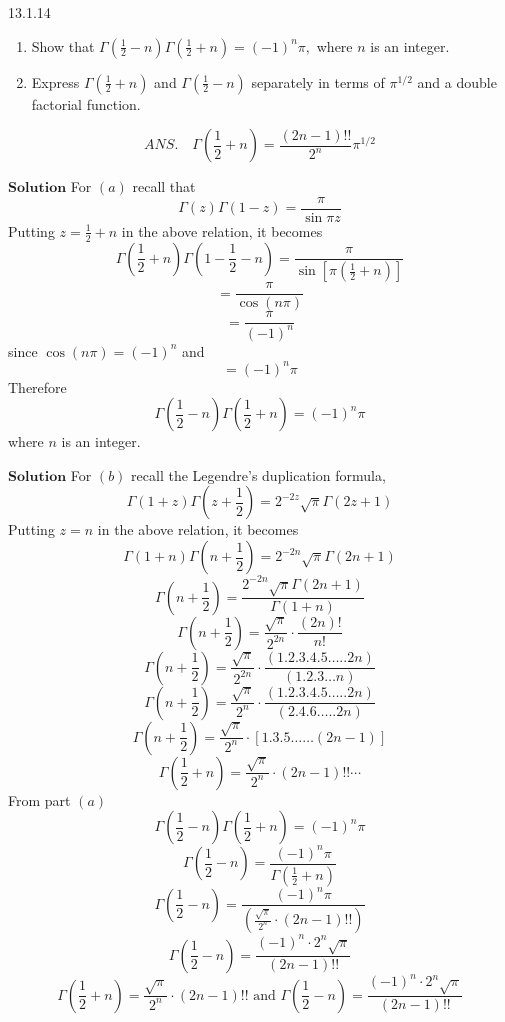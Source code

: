 \documentclass{styles/kaobook}
\begin{document}
\begin{greenbox}{13.1.14}
\begin{enumerate}[$(a)$]
\item Show that $\Gamma\left(\frac{1}{2}-n\right) \Gamma\left(\frac{1}{2}+n\right)=(-1)^{n} \pi,$ where $n$ is an integer. 
\item Express $\Gamma\left(\frac{1}{2}+n\right)$ and $\Gamma\left(\frac{1}{2}-n\right)$ separately in terms of $\pi^{1 / 2}$ and a double factorial function.
\end{enumerate}
$$
A N S . \quad \Gamma\left(\frac{1}{2}+n\right)=\frac{(2 n-1) ! !}{2^{n}} \pi^{1 / 2}
$$
\end{greenbox}

$\boxed{\textbf{Solution}}$ For $(a)$ recall that 
$$\Gamma(z) \Gamma(1-z)=\frac{\pi}{\sin \pi z}$$
Putting $z=\frac{1}{2}+n$ in the above relation, it becomes
$$
\Gamma\left(\frac{1}{2}+n\right) \Gamma\left(1-\frac{1}{2}-n\right)=\frac{\pi}{\sin \left[\pi\left(\frac{1}{2}+n\right)\right]}
$$
$$
=\frac{\pi}{\cos (n \pi)}
$$
$$
=\frac{\pi}{(-1)^{n}}
$$
since $\cos (n \pi)=(-1)^{n}$ and
$$
=(-1)^{n} \pi
$$
Therefore 
$$\Gamma\left(\frac{1}{2}-n\right) \Gamma\left(\frac{1}{2}+n\right)=(-1)^{n} \pi$$ where $n$ is an integer.

$\boxed{\textbf{Solution}}$ For $(b)$ recall the Legendre's duplication formula,
$$\Gamma(1+z) \Gamma\left(z+\frac{1}{2}\right)=2^{-2 z} \sqrt{\pi} \Gamma(2 z+1)$$
Putting $z=n$ in the above relation, it becomes
$$\Gamma(1+n) \Gamma\left(n+\frac{1}{2}\right)=2^{-2 n} \sqrt{\pi} \Gamma(2 n+1)$$
$$\Gamma\left(n+\frac{1}{2}\right)=\frac{2^{-2 n} \sqrt{\pi} \Gamma(2 n+1)}{\Gamma(1+n)}$$
$$\Gamma\left(n+\frac{1}{2}\right)=\frac{\sqrt{\pi}}{2^{2 n}} \cdot \frac{(2 n) !}{n !}$$
$$\Gamma\left(n+\frac{1}{2}\right)=\frac{\sqrt{\pi}}{2^{2 n}} \cdot \frac{(1.2 .3 .4 .5 \ldots . .2 n)}{(1.2 .3 \ldots n)}$$
$$\Gamma\left(n+\frac{1}{2}\right)=\frac{\sqrt{\pi}}{2^{n}} \cdot \frac{(1.2 .3 .4 .5 \ldots . .2 n)}{(2.4 .6 \ldots . .2 n)}$$
$$\Gamma\left(n+\frac{1}{2}\right)=\frac{\sqrt{\pi}}{2^{n}} \cdot[1.3 .5 \ldots \ldots(2 n-1)]$$
$$
\Gamma\left(\frac{1}{2}+n\right)=\frac{\sqrt{\pi}}{2^{n}} \cdot(2 n-1) ! ! \cdots
$$
From part $(a)$ 
$$
\Gamma\left(\frac{1}{2}-n\right) \Gamma\left(\frac{1}{2}+n\right)=(-1)^{n} \pi
$$
$$\Gamma\left(\frac{1}{2}-n\right)=\frac{(-1)^{n} \pi}{\Gamma\left(\frac{1}{2}+n\right)}$$
$$\Gamma\left(\frac{1}{2}-n\right)=\frac{(-1)^{n} \pi}{\left(\frac{\sqrt{\pi}}{2^{n}} \cdot(2 n-1) ! !\right)}$$
$$
\Gamma\left(\frac{1}{2}-n\right)=\frac{(-1)^{n} \cdot 2^{n} \sqrt{\pi}}{(2 n-1) ! !}
$$
$$
\Gamma\left(\frac{1}{2}+n\right)=\frac{\sqrt{\pi}}{2^{n}} \cdot(2 n-1) ! ! \text { and } \Gamma\left(\frac{1}{2}-n\right)=\frac{(-1)^{n} \cdot 2^{n} \sqrt{\pi}}{(2 n-1) ! !}
$$
\end{document}
